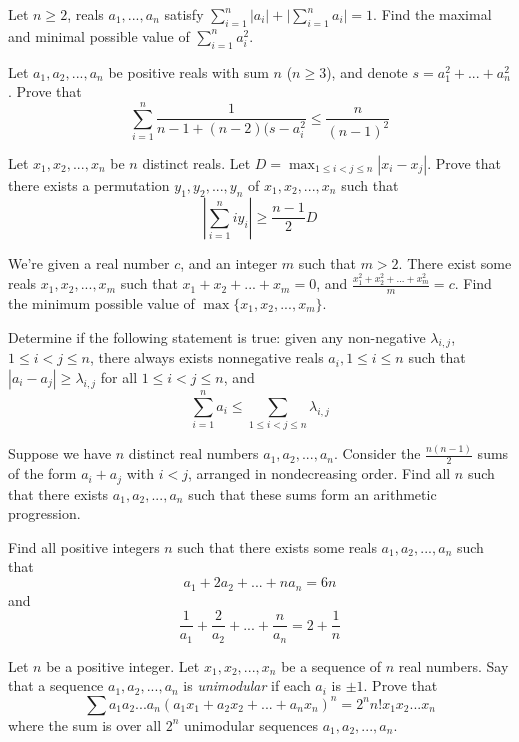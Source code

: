  {Let $n\ge 2$, reals $a_1,...,a_n$ satisfy $\sum_{i=1}^n |a_i| + \lvert \sum_{i=1}^n a_i\rvert = 1$. Find the maximal and minimal possible value of $\sum_{i=1}^n a_i^2$.}

 {Let $a_1,a_2,...,a_n$ be positive reals with sum $n$ ($n\ge 3$), and denote $s=a_1^2+...+a_n^2$. Prove that $$\sum_{i=1}^n \frac{1}{n-1+(n-2)(s-a_i^2} \le \frac{n}{(n-1)^2}$$}

 {Let $x_1,x_2,...,x_n$ be $n$ distinct reals. Let $D=\max_{1\le i<j\le n} |x_i-x_j|$. Prove that there exists a permutation $y_1,y_2,...,y_n$ of $x_1,x_2,...,x_n$ such that $$\left\lvert \sum_{i=1}^n iy_i \right\rvert \ge \frac{n-1}{2}D $$}

 {We're given a real number $c$, and an integer $m$ such that $m>2$. There exist some reals $x_1, x_2, ..., x_m$ such that $x_1 + x_2 + ... + x_m = 0$, and $\frac{x_1^2+x_2^2+...+x_m^2}m=c$. Find the minimum possible value of $\max\{x_1,x_2,...,x_m\}$.}

 {Determine if the following statement is true: given any non-negative $\lambda_{i,j}$, $1\le i<j\le n$, there always exists nonnegative reals $a_i, 1\le i\le n$ such that $|a_i-a_j|\ge \lambda_{i,j}$ for all $1\le i<j\le n$, and $$\sum_{i=1}^n a_i\le \sum_{1\le i<j\le n}\lambda_{i,j}$$}



 {Suppose we have $n$ distinct real numbers $a_1, a_2,..., a_n$. Consider the $\frac{n(n-1)}{2}$ sums of the form $a_i + a_j$ with $i<j$, arranged in nondecreasing order. Find all $n$ such that there exists $a_1, a_2, ..., a_n$ such that these sums form an arithmetic progression.}

 {Find all positive integers $n$ such that there exists some reals $a_1, a_2, ..., a_n$ such that
    \[a_1 + 2a_2 + ... + na_n = 6n\]
    and
    \[\frac1{a_1}+\frac2{a_2}+...+\frac{n}{a_n}=2+\frac1n\]}



 {Let $n$ be a positive integer. Let $x_1, x_2,..., x_n$ be a sequence of $n$ real numbers. Say that a sequence $a_1, a_2,..., a_n$ is
\textit{unimodular} if each $a_i$ is $\pm 1$. Prove that $$\sum a_1a_2...a_n(a_1x_1+a_2x_2+...+a_nx_n)^n= 2^nn!x_1x_2...x_n$$ where the sum is over all $2^n$ unimodular sequences $a_1,a_2,...,a_n$.}

